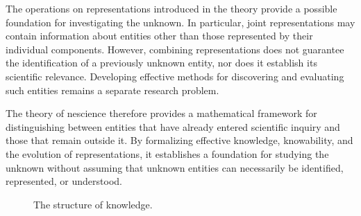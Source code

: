 The operations on representations introduced in the theory provide a possible foundation for investigating the unknown. In particular, joint representations may contain information about entities other than those represented by their individual components. However, combining representations does not guarantee the identification of a previously unknown entity, nor does it establish its scientific relevance. Developing effective methods for discovering and evaluating such entities remains a separate research problem.

The theory of nescience therefore provides a mathematical framework for distinguishing between entities that have already entered scientific inquiry and those that remain outside it. By formalizing effective knowledge, knowability, and the evolution of representations, it establishes a foundation for studying the unknown without assuming that unknown entities can necessarily be identified, represented, or understood.

\begin{figure}[ht]
\centering
{}
\caption{\label{fig:NewTopics}The structure of knowledge.}
\end{figure}


